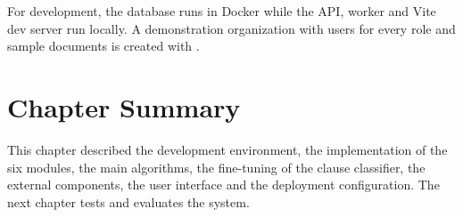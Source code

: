 For development, the database runs in Docker while the API, worker and Vite dev server run locally.
A demonstration organization with users for every role and sample documents is created with
.

\section{Chapter Summary}
This chapter described the development environment, the implementation of the six modules, the main
algorithms, the fine-tuning of the clause classifier, the external components, the user interface and
the deployment configuration. The next chapter tests and evaluates the system.
